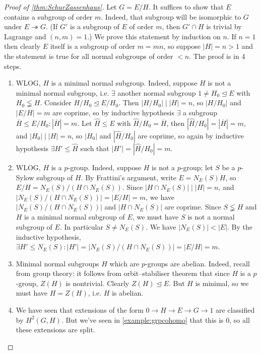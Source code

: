 \documentclass{article}
\theoremstyle{definition}
\begin{document}
\begin{proof}[Proof of \ref{thm:SchurZassenhaus}]
Let $G=E/H$. It suffices to show that $E$ contains a subgroup of order $m$. Indeed, that subgroup will be isomorphic to $G$ under $E\twoheadrightarrow G$. (If $G'$ is a subgroup of $E$ of order $m$, then $G'\cap H$ is trivial by Lagrange and $(n,m)=1$.) We prove this statement by induction on $n$. If $n=1$ then clearly $E$ itself is a subgroup of order $m=mn$, so suppose $|H|=n>1$ and the statement is true for all normal subgroups of order $<n$. The proof is in 4 steps.
\begin{enumerate}
\item WLOG, $H$ is a minimal normal subgroup. Indeed, suppose $H$ is not a minimal normal subgroup, i.e. $\exists$ another normal subgroup $1\neq H_0\unlhd E$ with $H_0\lneqq H$. Consider $H/H_0\unlhd E/H_0$. Then $|H/H_0|\mid |H|=n$, so $|H/H_0|$ and $|E/H|=m$ are coprime, so by inductive hypothesis $\exists$ a subgroup $\overline H\leq E/H_0:|\overline H|=m$. Let $\widehat H\leq E$ with $\widehat H/H_0=\overline H$, then $|\widehat H/H_0|=|\overline H|=m$, and $|H_0|\mid |H|=n$, so $|H_0|$ and $|\widehat H/H_0|$ are coprime, so again by inductive hypothesis $\exists H'\leq \widehat H$ such that $|H'|=|\widehat H/H_0|=m$.
\item WLOG, $H$ is a $p$-group. Indeed, suppose $H$ is not a $p$-group; let $S$ be a $p$-Sylow subgroup of $H$. By Frattini's argument, write $E=N_E(S)H$, so $E/H=N_E(S)/(H\cap N_E(S))$. Since $|H\cap N_E(S)|\mid |H|=n$, and $|N_E(S)/(H\cap N_E(S))|=|E/H|=m$, we have $|N_E(S)/(H\cap N_E(S))|$ and $|H\cap N_E(S)|$ are coprime. Since $S\lneqq H$ and $H$ is a minimal normal subgroup of $E$, we must have $S$ is not a normal subgroup of $E$. In particular $S\neq N_E(S)$. We have $|N_E(S)|<|E|$. By the inductive hypothesis, $\exists H'\leq N_E(S):|H'|=|N_E(S)/(H\cap N_E(S))|=|E/H|=m$.
\item Minimal normal subgroups $H$ which are $p$-groups are abelian. Indeed, recall from group theory: it follows from orbit--stabiliser theorem that since $H$ is a $p$-group, $Z(H)$ is nontrivial. Clearly $Z(H)\unlhd E$. But $H$ is minimal, so we must have $H=Z(H)$, i.e. $H$ is abelian.
\item We have seen that extensions of the form $0\rightarrow H\rightarrow E\rightarrow G\rightarrow 1$ are classified by $H^2(G,H)$. But we've seen in \ref{example:grpcohomo} that this is 0, so all these extensions are split.
\end{enumerate}
\end{proof}
\end{document}
